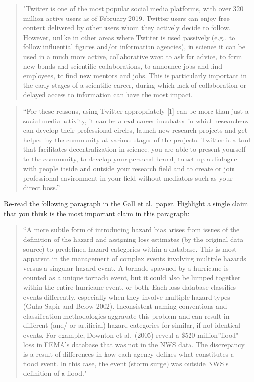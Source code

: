 \documentclass[]{tufte-book}
\begin{document}
\begin{quote}
"Twitter is one of the most popular social media platforms, with over 320
million active users as of February 2019. Twitter users can enjoy free content
delivered by other users whom they actively decide to follow. However, unlike in
other areas where Twitter is used passively (e.g., to follow influential figures
and/or information agencies), in science it can be used in a much more active,
collaborative way: to ask for advice, to form new bonds and scientific
collaborations, to announce jobs and find employees, to find new mentors and
jobs. This is particularly important in the early stages of a scientific career,
during which lack of collaboration or delayed access to information can have the
most impact.
\end{quote}

\begin{quote}
``For these reasons, using Twitter appropriately {[}1{]} can be more than
just a social media activity; it can be a real career incubator in which
researchers can develop their professional circles, launch new research projects
and get helped by the community at various stages of the projects. Twitter is a
tool that facilitates decentralization in science; you are able to present
yourself to the community, to develop your personal brand, to set up a dialogue
with people inside and outside your research field and to create or join
professional environment in your field without mediators such as your direct
boss.''
\end{quote}

Re-read the following paragraph in the Gall et al.~paper. Highlight
a single claim that you think is the most important claim in this paragraph:

\begin{quote}
``A more subtle form of introducing hazard bias arises from issues of the
definition of the hazard and assigning loss estimates (by the original data
source) to predefined hazard categories within a database. This is most apparent
in the management of complex events involving multiple hazards versus a singular
hazard event. A tornado spawned by a hurricane is counted as a unique tornado
event, but it could also be lumped together within the entire hurricane event,
or both. Each loss database classifies events differently, especially when they
involve multiple hazard types (Guha-Sapir and Below 2002). Inconsistent naming
conventions and classification methodologies aggravate this problem and can
result in different (and/ or artificial) hazard categories for similar, if not
identical events. For example, Downton et al.~(2005) reveal a \$520 million''flood" loss in FEMA's database that was not in the NWS data. The discrepancy is
a result of differences in how each agency defines what constitutes a flood
event. In this case, the event (storm surge) was outside NWS's definition of a
flood."
\end{quote}
\end{document}
